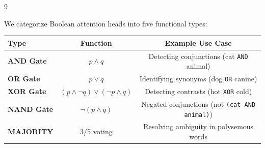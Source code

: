 \documentclass[11pt]{article}
\theoremstyle{definition}
\begin{document}
\begin{thebibliography}{9}
{{{We categorize Boolean attention heads into five functional types:













\begin{table}[h]






\centering






\begin{tabular}{|l|c|c|}






\hline






\textbf{Type} & \textbf{Function} & \textbf{Example Use Case} \\






\hline






\textbf{AND Gate} & $p \land q$ & Detecting conjunctions (cat \texttt{AND} animal) \\






\textbf{OR Gate} & $p \lor q$ & Identifying synonyms (dog \texttt{OR} canine) \\






\textbf{XOR Gate} & $(p \land \neg q) \lor (\neg p \land q)$ & Detecting contrasts (hot \texttt{XOR} cold) \\






\textbf{NAND Gate} & $\neg(p \land q)$ & Negated conjunctions (not \texttt{(cat AND animal)}) \\






\textbf{MAJORITY} & 3/5 voting & Resolving ambiguity in polysemous words \\







\end{tabular}
\end{table}}}}
\end{thebibliography}
\end{document}

